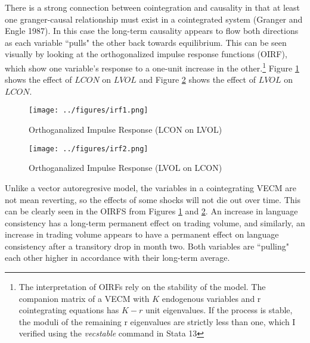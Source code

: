 There is a strong connection between cointegration and causality in that at least one granger-causal relationship must exist in a cointegrated system (Granger and Engle 1987). In this case the long-term causality appears to flow both directions as each variable ``pulls" the other back towards equilibrium. This can be seen visually by looking at the orthogonalized impulse response functions (OIRF), which show one variable's response to a one-unit increase in the other.\footnote{The interpretation of OIRFs rely on the stability of the model. The companion matrix of a VECM with $K$ endogenous variables and r cointegrating equations has $K - r$ unit eigenvalues. If the process is stable, the moduli of the remaining r eigenvalues are strictly less than one, which I verified using the \emph{vecstable} command in Stata 13} Figure \ref{irf1} shows the effect of $LCON$ on $LVOL$ and Figure \ref{irf2} shows the effect of $LVOL$ on $LCON$. 

\begin{figure}
\begin{center}
\texttt{[image: ../figures/irf1.png]}
\caption[Orthoganalized Impulse Response (LCON on LVOL)]{Orthoganalized Impulse Response (LCON on LVOL)\label{irf1}}
\end{center}
\end{figure}

\begin{figure}
\begin{center}
\texttt{[image: ../figures/irf2.png]}
\caption[Orthoganalized Impulse Response (LVOL on LCON)]{Orthoganalized Impulse Response (LVOL on LCON)\label{irf2}}
\end{center}
\end{figure}

Unlike a vector autoregresive model, the variables in a cointegrating VECM are not mean reverting, so the effects of some shocks will not die out over time. This can be clearly seen in the OIRFS from Figures \ref{irf1} and \ref{irf2}. An increase in language consistency has a long-term permanent effect on trading volume, and similarly, an increase in trading volume appears to have a permanent effect on language consistency after a transitory drop in month two. Both variables are ``pulling" each other higher in accordance with their long-term average.

